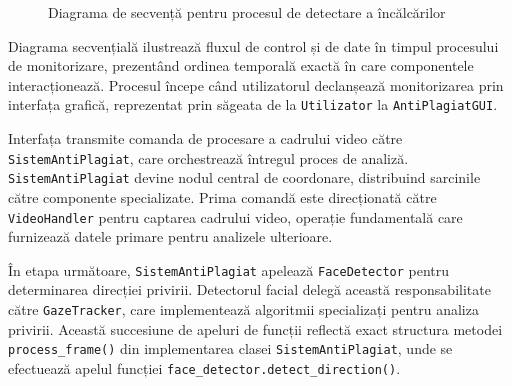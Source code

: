 \documentclass[12pt,a4paper]{article}
\begin{document}
\begin{figure}[H]
        \caption{Diagrama de secvență pentru procesul de detectare a încălcărilor}
    \end{figure}


Diagrama secvențială ilustrează fluxul de control și de date în timpul procesului de monitorizare, prezentând ordinea temporală exactă în care componentele interacționează. Procesul începe când utilizatorul declanșează monitorizarea prin interfața grafică, reprezentat prin săgeata de la \texttt{Utilizator} la \texttt{AntiPlagiatGUI}.

Interfața transmite comanda de procesare a cadrului video către \texttt{SistemAntiPlagiat}, care orchestrează întregul proces de analiză. \texttt{SistemAntiPlagiat} devine nodul central de coordonare, distribuind sarcinile către componente specializate. Prima comandă este direcționată către \texttt{VideoHandler} pentru captarea cadrului video, operație fundamentală care furnizează datele primare pentru analizele ulterioare.

În etapa următoare, \texttt{SistemAntiPlagiat} apelează \texttt{FaceDetector} pentru determinarea direcției privirii. Detectorul facial delegă această responsabilitate către \texttt{GazeTracker}, care implementează algoritmii specializați pentru analiza privirii. Această succesiune de apeluri de funcții reflectă exact structura metodei \texttt{process\_frame()} din implementarea clasei \texttt{SistemAntiPlagiat}, unde se efectuează apelul funcției \texttt{face\_detector.detect\_direction()}.
\end{document}
